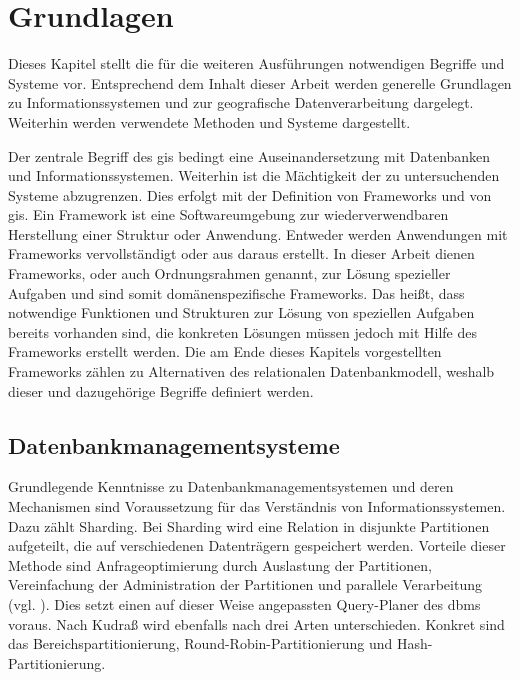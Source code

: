 \chapter{Grundlagen}
\label{Grundlagen}

Dieses Kapitel stellt die für die weiteren Ausführungen notwendigen Begriffe und Systeme vor.
Entsprechend dem Inhalt dieser Arbeit werden generelle Grundlagen zu Informationssystemen und zur geografische Datenverarbeitung dargelegt.
Weiterhin werden verwendete Methoden und Systeme dargestellt.

Der zentrale Begriff des \Gls{gis} bedingt eine Auseinandersetzung mit Datenbanken und Informationssystemen.
Weiterhin ist die Mächtigkeit der zu untersuchenden Systeme abzugrenzen.
Dies erfolgt mit der Definition von Frameworks und von \Gls{gis}.
Ein Framework ist eine Softwareumgebung zur wiederverwendbaren Herstellung einer Struktur oder Anwendung.
Entweder werden Anwendungen mit Frameworks vervollständigt oder aus daraus erstellt.
In dieser Arbeit dienen Frameworks, oder auch Ordnungsrahmen genannt, zur Lösung spezieller Aufgaben und sind somit domänenspezifische Frameworks.
Das heißt, dass notwendige Funktionen und Strukturen zur Lösung von speziellen Aufgaben bereits vorhanden sind, die konkreten Lösungen müssen jedoch mit Hilfe des Frameworks erstellt werden.
Die am Ende dieses Kapitels vorgestellten Frameworks zählen zu Alternativen des relationalen Datenbankmodell, weshalb dieser und dazugehörige Begriffe definiert werden.

\section{Datenbankmanagementsysteme}

Grundlegende Kenntnisse zu Datenbankmanagementsystemen und deren Mechanismen sind Voraussetzung für das Verständnis von Informationssystemen.
Dazu zählt Sharding.
Bei Sharding wird eine Relation in disjunkte Partitionen aufgeteilt, die auf verschiedenen Datenträgern gespeichert werden.
Vorteile dieser Methode sind Anfrageoptimierung durch Auslastung der Partitionen, Vereinfachung der Administration der Partitionen und parallele Verarbeitung (vgl. \cite[S.296]{book:kudrass}).
Dies setzt einen auf dieser Weise angepassten Query-Planer des \Gls{dbms} voraus.
Nach Kudraß wird ebenfalls nach drei Arten unterschieden.
Konkret sind das Bereichspartitionierung, Round-Robin-Partitionierung und Hash-Partitionierung.

